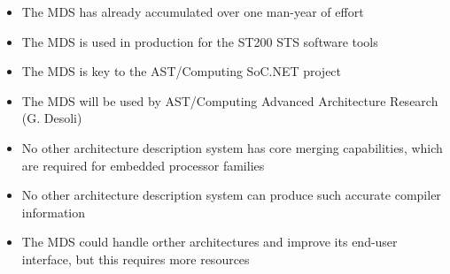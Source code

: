 \documentclass[a4]{seminar}
\begin{document}
\begin{slide}


\begin{itemize}

\item The MDS has already accumulated over one man-year of effort

\item The MDS is used in production for the ST200 STS software tools

\item The MDS is key to the AST/Computing SoC.NET project

\item The MDS will be used by AST/Computing Advanced Architecture Research (G.
Desoli)

\item No other architecture description system has core merging capabilities,
which are required for embedded processor families

\item No other architecture description system can produce such accurate
compiler information

\item The MDS could handle orther architectures and improve its end-user
interface, but this requires more resources

\end{itemize}

\end{slide}
\end{document}
